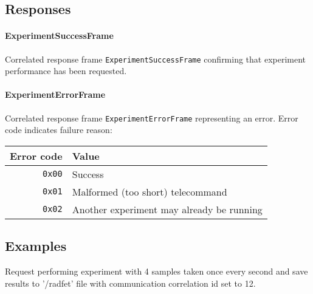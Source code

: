 \subsection{Responses}
\paragraph{ExperimentSuccessFrame}

Correlated response frame \texttt{ExperimentSuccessFrame} confirming 
that \radfet experiment performance has been requested.

\paragraph{ExperimentErrorFrame}
Correlated response frame \texttt{ExperimentErrorFrame} representing an error. 
Error code indicates failure reason:

\begin{tabular}{r | l}
    Error code & Value \\
    \hline
    \texttt{0x00}   & Success \\
    \texttt{0x01}   & Malformed (too short) telecommand \\
    \texttt{0x02}   & Another experiment may already be running \\
\end{tabular}

\subsection{Examples}
Request performing \radfet experiment with 4 samples taken once every second and save results
to '/radfet' file with communication correlation id set to 12.

